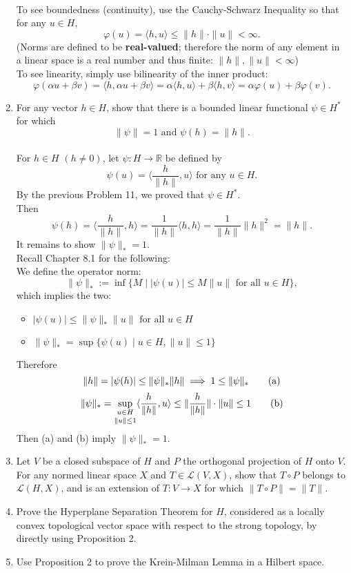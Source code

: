 \begin{enumerate}
    \\To see boundedness (continuity), use the Cauchy-Schwarz Inequality so that for any $u\in H$,
    \[
        \varphi(u)=\langle h,u\rangle\le\|h\|\cdot\|u\|<\infty.
    \]
    (Norms are defined to be \textbf{real-valued}; therefore the norm of any element in a linear space is a real number and thus finite: $\|h\|,\|u\|<\infty$)
    \\To see linearity, simply use bilinearity of the inner product:
    \[
        \varphi(\alpha u+\beta v)=\langle h,\alpha u+\beta v\rangle=\alpha\langle h,u\rangle+\beta\langle h,v\rangle=\alpha\varphi(u)+\beta\varphi(v).
    \]
    \item For any vector $h\in H$, show that there is a bounded linear functional $\psi\in H^*$ for which 
    \[
        \|\psi\|=1\text{ and }\psi(h)=\|h\|.  
    \]
    \\For $h\in H$ $(h\neq0)$, let $\psi:H\to\mathbb{R}$ be defined by 
    \[
        \psi(u)=\langle \frac{h}{\|h\|},u\rangle\text{ for any }u\in H.
    \]
    By the previous Problem 11, we proved that $\psi\in H^*$.
    \\Then 
    \[
        \psi(h)=\langle \frac{h}{\|h\|},h\rangle=\frac{1}{\|h\|}\langle h,h\rangle=\frac{1}{\|h\|}\|h\|^2=\|h\|.
    \]
    It remains to show $\|\psi\|_*=1$.
    \\Recall Chapter 8.1 for the following:
    \\We define the operator norm:
    \[
        \|\psi\|_*:=\inf\{M\mid|\psi(u)|\le M\|u\|\text{ for all }u\in H\},
    \]
    which implies the two: 
    \begin{itemize}
        \item $|\psi(u)|\le \|\psi\|_*\|u\|\text{ for all }u\in H$
        \item $\|\psi\|_*=\sup\{\psi(u)\mid u\in H, \|u\|\le1\}$
    \end{itemize}
    Therefore
    \[
        \|h\|=|\psi(h)|\le \|\psi\|_*\|h\|\implies 1\le \|\psi\|_*\tag{\text{a}}
    \]
    \[
        \|\psi\|_*=\underset{\|u\|\le1}{\underset{u\in H}{\sup}}\langle \frac{h}{\|h\|},u\rangle\le \|\frac{h}{\|h\|}\|\cdot\|u\|\le1\tag{\text{b}}
    \]
    Then (a) and (b) imply $\|\psi\|_*=1$.
    \item Let $V$ be a closed subspace of $H$ and $P$ the orthogonal projection of $H$ onto $V$.
    For any normed linear space $X$ and $T\in\mathcal{L}(V,X)$, show that $T\circ P$ belongs to $\mathcal{L}(H,X)$, and is an extension of $T:V\to X$ for which $\|T\circ P\|=\|T\|$.
    \item Prove the Hyperplane Separation Theorem for $H$, considered as a locally convex topological vector space with respect to the strong topology, by directly using Proposition 2.
    \item Use Proposition 2 to prove the Krein-Milman Lemma in a Hilbert space.
\end{enumerate}


